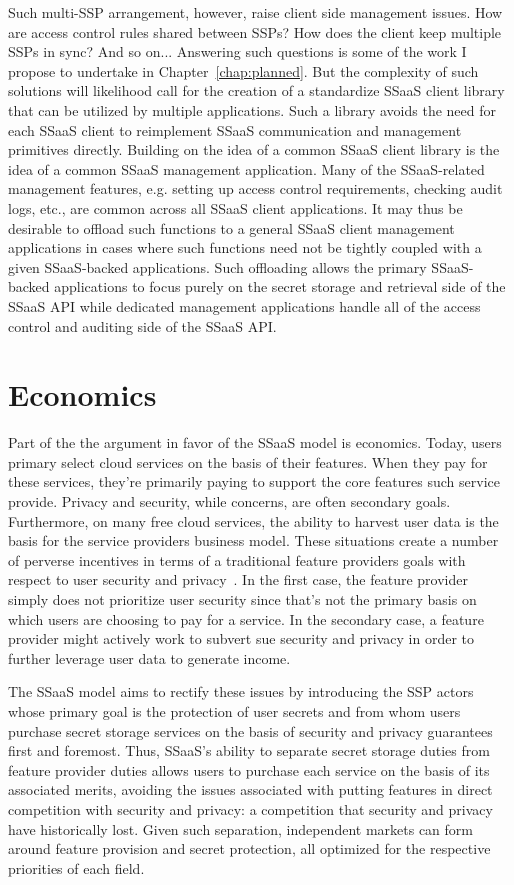 Such multi-SSP arrangement, however, raise client side management
issues. How are access control rules shared between SSPs? How does the
client keep multiple SSPs in sync? And so on... Answering such
questions is some of the work I propose to undertake in
Chapter~\ref{chap:planned}. But the complexity of such solutions will
likelihood call for the creation of a standardize SSaaS client library
that can be utilized by multiple applications. Such a library avoids
the need for each SSaaS client to reimplement SSaaS communication and
management primitives directly. Building on the idea of a common SSaaS
client library is the idea of a common SSaaS management
application. Many of the SSaaS-related management features,
e.g. setting up access control requirements, checking audit logs,
etc., are common across all SSaaS client applications. It may thus be
desirable to offload such functions to a general SSaaS client
management applications in cases where such functions need not be
tightly coupled with a given SSaaS-backed applications. Such
offloading allows the primary SSaaS-backed applications to focus
purely on the secret storage and retrieval side of the SSaaS API while
dedicated management applications handle all of the access control and
auditing side of the SSaaS API.

\section{Economics}

Part of the the argument in favor of the SSaaS model is
economics. Today, users primary select cloud services on the basis of
their features. When they pay for these services, they're primarily
paying to support the core features such service provide. Privacy and
security, while concerns, are often secondary goals. Furthermore, on
many free cloud services, the ability to harvest user data is the
basis for the service providers business model. These situations
create a number of perverse incentives in terms of a traditional
feature providers goals with respect to user security and
privacy~\cite{anderson2001}. In the first case, the feature provider
simply does not prioritize user security since that's not the primary
basis on which users are choosing to pay for a service. In the
secondary case, a feature provider might actively work to subvert sue
security and privacy in order to further leverage user data to
generate income.

The SSaaS model aims to rectify these issues by introducing the SSP
actors whose primary goal is the protection of user secrets and from
whom users purchase secret storage services on the basis of security
and privacy guarantees first and foremost. Thus, SSaaS's ability to
separate secret storage duties from feature provider duties allows
users to purchase each service on the basis of its associated merits,
avoiding the issues associated with putting features in direct
competition with security and privacy: a competition that security and
privacy have historically lost. Given such separation, independent
markets can form around feature provision and secret protection, all
optimized for the respective priorities of each field.

